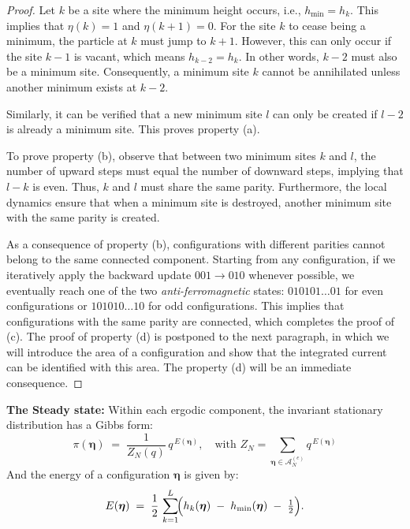 \documentclass[pdflatex,sn-mathphys-num]{sn-jnl}
\theoremstyle{definition}
\theoremstyle{remark}
\numberwithin{equation}{section}
\newcommand{\bfeta}{\boldsymbol{\eta}}
\begin{document}
\begin{proof}
Let \( k \) be a site where the minimum height occurs, i.e., \( h_{\text{min}} = h_k \). This implies that \( \eta(k) = 1 \) and \( \eta(k + 1) = 0 \). For the site \( k \) to cease being a minimum, the particle at \( k \) must jump to \( k+1 \). However, this can only occur if the site \( k-1 \) is vacant, which means \( h_{k-2} = h_k \). In other words, \( k-2 \) must also be a minimum site. Consequently, a minimum site \( k \) cannot be annihilated unless another minimum exists at \( k-2 \).

Similarly, it can be verified that a new minimum site \( l \) can only be created if \( l-2 \) is already a minimum site. This proves property (a).

To prove property (b), observe that between two minimum sites \( k \) and \( l \), the number of upward steps must equal the number of downward steps, implying that \( l - k \) is even. Thus, \( k \) and \( l \) must share the same parity. Furthermore, the local dynamics ensure that when a minimum site is destroyed, another minimum site with the same parity is created.

As a consequence of property (b), configurations with different parities cannot belong to the same connected component. Starting from any configuration, if we iteratively apply the backward update \( 001 \to 010 \) whenever possible, we eventually reach one of the two \textit{anti-ferromagnetic} states: \( 010101\ldots01 \) for even configurations or \( 101010\ldots10 \) for odd configurations. This implies that configurations with the same parity are connected, which completes the proof of (c). The proof of property (d) is postponed to the next paragraph, in which we will introduce the area of a configuration and show that the integrated current can be identified with this area. The property (d) will be an immediate consequence.
\end{proof}

\noindent
\textbf{The Steady state:} Within each ergodic component, the invariant stationary distribution has a Gibbs form:
\begin{equation}
\label{invmeasure}
\pi(\bfeta ) \;=\; \frac{1}{Z_{N} (q)}\,q^{\,E(\boldsymbol{\eta})}, \quad \text{with } Z_N = \sum_{\bfeta \in \mathcal{A}_N^{(e)}} q^{\,E(\boldsymbol{\eta})}
\end{equation}
And the energy of a configuration $\boldsymbol{\eta}$ is given by:
\begin{equation}
\label{E}
E(\boldsymbol{\eta}) \;=\; \frac{1}{2}\,
\sum_{k=1}^{L}\!\Bigl(h_{k} (\bfeta )\;-\;h_{\text{min}}(\boldsymbol{\eta})
\;-\;\tfrac{1}{2}
\Bigr).
\end{equation}
\end{document}
